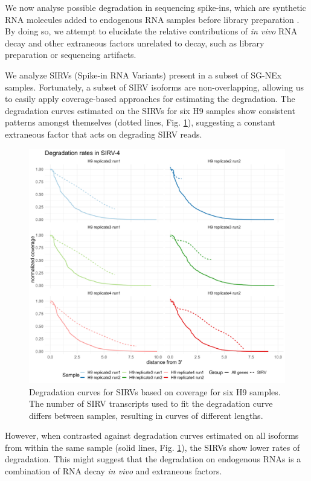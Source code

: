 We now analyse possible degradation in sequencing spike-ins, which are synthetic RNA molecules added to endogenous RNA samples before library preparation \cite{Lexogen20201}. By doing so, we attempt to elucidate the relative contributions of \textit{in vivo} RNA decay and other extraneous factors unrelated to decay, such as library preparation or sequencing artifacts.

We analyze SIRVs (Spike-in RNA Variants) present in a subset of SG-NEx samples. Fortunately, a subset of SIRV isoforms are non-overlapping, allowing us to easily apply coverage-based approaches for estimating the degradation. The degradation curves estimated on the SIRVs for six H9 samples show consistent patterns amongst themselves (dotted lines, Fig. \ref{fig:cov-spike}), suggesting a constant extraneous factor that acts on degrading SIRV reads. 

\begin{figure}[H]
    \centering
    \includegraphics[width=\textwidth]{figures/sec-2-cov-spike.png}
    \caption[Degradation curves for SIRVs based on coverage]{Degradation curves for SIRVs based on coverage for six H9 samples. The number of SIRV transcripts used to fit the degradation curve differs between samples, resulting in curves of different lengths.}
    \label{fig:cov-spike}
\end{figure}

However, when contrasted against degradation curves estimated on all isoforms from within the same sample (solid lines, Fig. \ref{fig:cov-spike}), the SIRVs show lower rates of degradation. This might suggest that the degradation on endogenous RNAs is a combination of RNA decay \textit{in vivo} and extraneous factors. 

